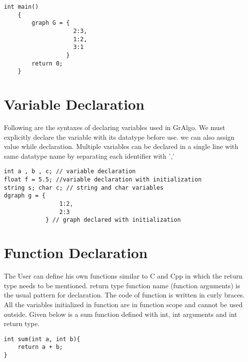 \documentclass[english,a4paper,12pt]{report}
\begin{document}
    \begin{lstlisting}[style=CStyle] 
    int main()
    {
        graph G = { 
                    2:3, 
                    1:2,
                    3:1
                  }
        return 0;
    }
    \end{lstlisting}

\section{Variable Declaration}
Following are the syntaxes of declaring variables used in GrAlgo. We must explicitly 
declare the variable with its datatype before use. we can also assign value while
declaration. Multiple variables can be declared in a single line with same datatype
name by separating each identifier with ','

\begin{lstlisting}[style=CStyle]
int a , b , c; // variable declaration
float f = 5.5; //variable declaration with initialization
string s; char c; // string and char variables
dgraph g = { 
                1:2, 
                2:3
            } // graph declared with initialization
\end{lstlisting}

\section{Function Declaration}
The User can define his own functions similar to C and Cpp in which the return type needs to be mentioned. return type function name (function arguments) is the usual pattern for declaration. The code of function is written in curly braces. All 
the variables initialized in function are in function scope and cannot be used 
outside. Given below is a sum function defined with int, int arguments and int 
return type.

\begin{lstlisting}[style=CStyle]
int sum(int a, int b){
    return a + b;
}
\end{lstlisting}
\end{document}
